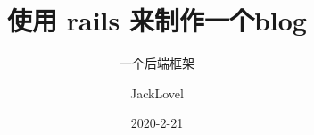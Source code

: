 \documentclass{beamer}
\title{使用 rails 来制作一个blog} %
\subtitle{一个后端框架}
\author{JackLovel}
\date{2020-2-21}
\begin{document}
\frame{\titlepage}
\end{document}
